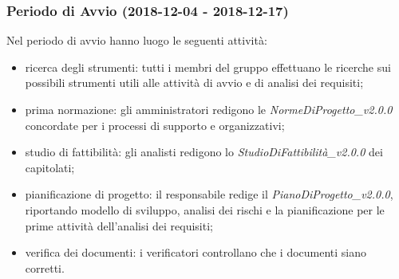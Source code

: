 	\subsubsection{Periodo di Avvio (2018-12-04 - 2018-12-17)}
		Nel periodo di avvio hanno luogo le seguenti attività:
		\begin{itemize}
			\item ricerca degli strumenti: tutti i membri del gruppo effettuano le ricerche sui possibili strumenti utili alle attività di avvio e di analisi dei requisiti;
			\item prima normazione: gli amministratori redigono le \textit{NormeDiProgetto\_v2.0.0} concordate per i processi di supporto e organizzativi;
			\item studio di fattibilità: gli analisti redigono lo \textit{StudioDiFattibilità\_v2.0.0} dei capitolati;
			\item pianificazione di progetto: il responsabile redige il \textit{PianoDiProgetto\_v2.0.0}, riportando modello di sviluppo, analisi dei rischi e la pianificazione per le prime attività dell'analisi dei requisiti;
			\item verifica dei documenti: i verificatori controllano che i documenti siano corretti.
		\end{itemize}
		
